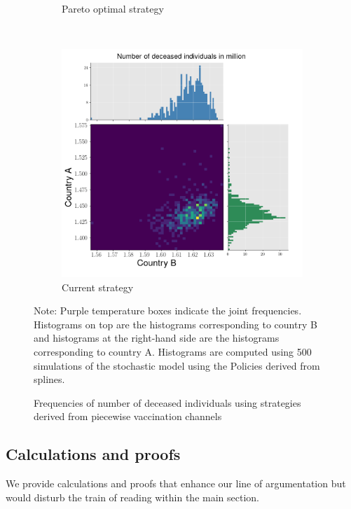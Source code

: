 \begin{figure}[h!]
\begin{subfigure}[b]{0.49\textwidth}
         \caption{Pareto optimal strategy}
         \label{fig:2d_optimal_piecewise}
     \end{subfigure}
     \\
     \begin{subfigure}[b]{0.49\textwidth}
         \centering
         \includegraphics[width=\textwidth]{images/piecewise_stochastic_histogram_deceased_current.png}
         \caption{Current strategy}
         \label{fig:2d_piecewise}
     \end{subfigure}
\begin{flushleft}
\scriptsize{Note:} Purple temperature boxes indicate the joint frequencies. Histograms on top are the histograms corresponding to country B and histograms at the right-hand side are the histograms corresponding to country A. Histograms are computed using 500 simulations of the stochastic model using the Policies derived from splines. 
\end{flushleft}
        \caption{Frequencies of number of deceased individuals using strategies derived from piecewise vaccination channels}
        \label{fig:histograms_piecewise} 
\end{figure}

\clearpage
\subsection{Calculations and proofs}
We provide calculations and proofs that enhance our line of argumentation but would disturb the train of reading within the main section.
